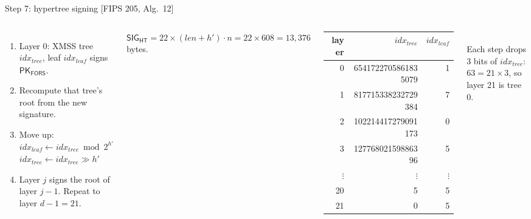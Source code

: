 \documentclass[aspectratio=169,11pt]{beamer}
\newcommand{\pk}[1]{\textcolor{pub}{#1}}
\newcommand{\alg}[1]{\textcolor{quiet}{\footnotesize[FIPS 205, Alg.~#1]}}
\begin{document}
\begin{frame}{Step 7: hypertree signing \alg{12}}
  \begin{columns}[T]
    \small
    \begin{enumerate}
      \item Layer 0: XMSS tree $\mathit{idx}_{\mathit{tree}}$, leaf $\mathit{idx}_{\mathit{leaf}}$ signs \pk{$\mathsf{PK}_{\mathsf{FORS}}$}.
      \item Recompute that tree's root from the new signature.
      \item Move up: \\
        $\mathit{idx}_{\mathit{leaf}} \gets \mathit{idx}_{\mathit{tree}} \bmod 2^{h'}$ \\
        $\mathit{idx}_{\mathit{tree}} \gets \mathit{idx}_{\mathit{tree}} \gg h'$
      \item Layer $j$ signs the root of layer $j-1$. Repeat to layer $d-1 = 21$.
    \end{enumerate}
    \vspace{1mm}
    $\mathsf{SIG_{HT}} = 22 \times (\mathit{len} + h')\cdot n = 22 \times 608 = 13{,}376$ bytes.
    \centering\footnotesize
    \begin{tabular}{@{}r r r@{}}
      \toprule
      layer & $\mathit{idx}_{\mathit{tree}}$ & $\mathit{idx}_{\mathit{leaf}}$ \\
      \midrule
      0 & 6541722705861835079 & 1 \\
      1 & 817715338232729384 & 7 \\
      2 & 102214417279091173 & 0 \\
      3 & 12776802159886396 & 5 \\
      $\vdots$ & $\vdots$ & $\vdots$ \\
      20 & 5 & 5 \\
      21 & 0 & 5 \\
      \bottomrule
    \end{tabular}\\[1mm]
    \textcolor{quiet}{Each step drops 3 bits of $\mathit{idx}_{\mathit{tree}}$: $63 = 21 \times 3$, so layer 21 is tree 0.}
  \end{columns}
\end{frame}
\end{document}

